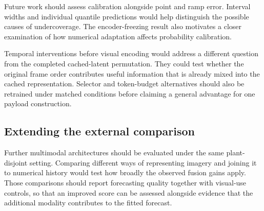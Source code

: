 Future work should assess calibration alongside point and ramp error. Interval widths and individual quantile predictions would help distinguish the possible causes of undercoverage. The encoder-freezing result also motivates a closer examination of how numerical adaptation affects probability calibration.

Temporal interventions before visual encoding would address a different question from the completed cached-latent permutation. They could test whether the original frame order contributes useful information that is already mixed into the cached representation. Selector and token-budget alternatives should also be retrained under matched conditions before claiming a general advantage for one payload construction.

\subsection{Extending the external comparison}

Further multimodal architectures should be evaluated under the same plant-disjoint setting. Comparing different ways of representing imagery and joining it to numerical history would test how broadly the observed fusion gains apply. Those comparisons should report forecasting quality together with visual-use controls, so that an improved score can be assessed alongside evidence that the additional modality contributes to the fitted forecast.
